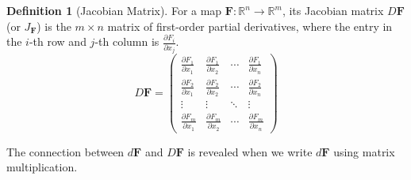 \documentclass[12pt, letterpaper]{article}
\theoremstyle{definition}
\newtheorem{defn}{Definition}[section]
\begin{document}
	\begin{defn}[Jacobian Matrix]
		For a map $\mathbf{F}: \mathbb{R}^n \to \mathbb{R}^m$, its Jacobian matrix $D\mathbf{F}$ (or $J_\mathbf{F}$) is the $m \times n$ matrix of first-order partial derivatives, where the entry in the $i$-th row and $j$-th column is $\frac{\partial F_i}{\partial x_j}$.
		\begin{equation*}
			D\mathbf{F} = \begin{pmatrix}
				\frac{\partial F_1}{\partial x_1} & \frac{\partial F_1}{\partial x_2} & \cdots & \frac{\partial F_1}{\partial x_n} \\
				\frac{\partial F_2}{\partial x_1} & \frac{\partial F_2}{\partial x_2} & \cdots & \frac{\partial F_2}{\partial x_n} \\
				\vdots & \vdots & \ddots & \vdots \\
				\frac{\partial F_m}{\partial x_1} & \frac{\partial F_m}{\partial x_2} & \cdots & \frac{\partial F_m}{\partial x_n}
			\end{pmatrix}
		\end{equation*}
	\end{defn}
	
	The connection between $d\mathbf{F}$ and $D\mathbf{F}$ is revealed when we write $d\mathbf{F}$ using matrix multiplication.
	
\end{document}
